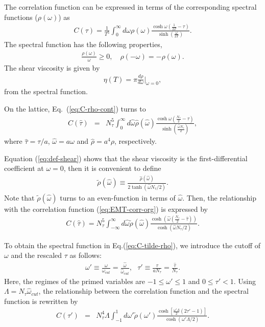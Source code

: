 \documentclass[a4paper,11pt]{article}
\newcommand\beq{ \begin{eqnarray} }
\newcommand\eeq{ \end{eqnarray} }
\begin{document}
The correlation function can be expressed in terms of the corresponding spectral functions ($\rho(\omega)$) as
\beq
C(\tau) = \frac{1}{T^5} \int_{0}^{\infty} d \omega \rho(\omega) \frac{\cosh \omega \left( \frac{1}{2T} - \tau \right)}{\sinh(\frac{\omega}{2T})}.\label{eq:C-rho-cont}
\eeq
The spectral function has the following properties,
\beq
\frac{\rho(\omega)}{\omega} \ge 0, \quad \rho(-\omega) = -\rho(\omega).
\eeq
The shear viscosity is given by 
\beq
\eta (T) = \pi \frac{d \rho}{d \omega} |_{\omega=0},\label{eq:def-shear}
\eeq
from the spectral function.


On the lattice, Eq.~(\ref{eq:C-rho-cont}) turns to
\beq
C(\hat{\tau})&=& N_\tau^5 \int^{\infty}_0 d \hat{\omega}  \hat{\rho}( \hat{\omega}) \frac{\cosh \hat{\omega} \left( \frac{N_\tau}{2} -\hat{\tau} \right)}{\sinh (\frac{\hat{\omega} N_\tau }{2})},\label{eq:EMT-corr-org}
\eeq
where $\hat{\tau}=\tau/a$, $\hat{\omega}=a \omega$ and $\hat{\rho} = a^4 \rho $, respectively.


Equation (\ref{eq:def-shear}) shows that the shear viscosity is the first-differential coefficient at $\omega=0$, then it is convenient to define
\beq
\tilde{\rho}(\hat{\omega}) \equiv \frac{\hat{\rho} (\hat{\omega})}{2  \tanh (\hat{\omega} N_\tau/2)} \label{eq:rho-tilde}.
\eeq
Note that $\tilde{\rho}(\hat{\omega})$ turns to an even-function in terms of $\hat{\omega}$.
Then, the relationship with the correlation function (\ref{eq:EMT-corr-org}) is expressed by
\beq
C(\hat{\tau}) = N_\tau ^5 \int_{-\infty}^\infty d \hat{\omega} \tilde{\rho}(\hat{\omega}) \frac{\cosh(\hat{\omega} \left( \frac{N_\tau}{2} -\hat{\tau} \right))}{ \cosh ( \hat{\omega} N_\tau/2 )}.\label{eq:C-tilde-rho}
\eeq


To obtain the spectral function in Eq.(\ref{eq:C-tilde-rho}), we introduce the cutoff of $\omega$ and the rescaled $\tau$ as follows:
\beq
\omega' \equiv \frac{\omega}{\omega_{cut}} = \frac{\hat{\omega}}{\hat{\omega}_{cut}}, ~~~ \tau' \equiv \frac{\tau}{aN_\tau}=\frac{\hat{\tau}}{N_\tau}.
\eeq
Here, the regimes of the primed variables are $-1 \le \omega' \le 1$ and $ 0 \le \tau' < 1$.
Using $\Lambda = N_\tau \hat{\omega}_{cut}$, the relationship between the correlation function and the spectral function is rewritten by
\beq
C(\tau')&=&N_\tau^4 \Lambda \int_{-1}^1 d \omega ' \tilde{\rho}(\omega ') \frac{\cosh [\frac{\omega ' \Lambda }{2} (2 \tau' -1)]}{\cosh (\omega ' \Lambda /2)}.
\eeq
\end{document}
